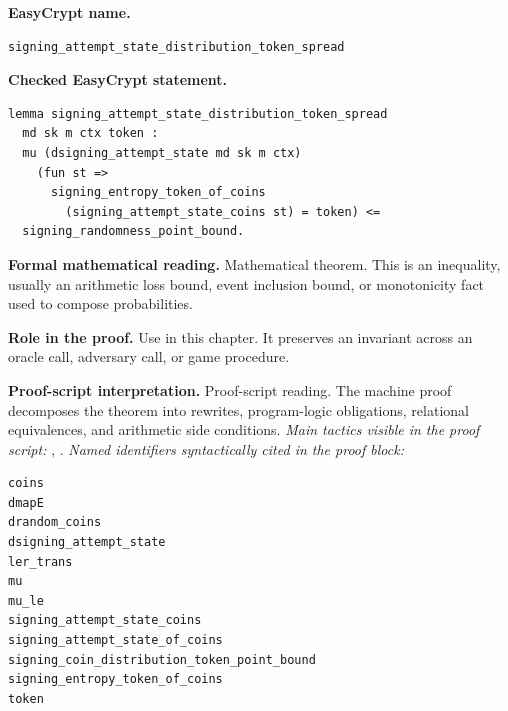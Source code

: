 \begin{formaltheorem}
\noindent\textbf{EasyCrypt name.}
\begin{lstlisting}[language=EasyCrypt,basicstyle=\ttfamily\scriptsize]
signing_attempt_state_distribution_token_spread
\end{lstlisting}
\noindent\textbf{Checked EasyCrypt statement.}
\begin{lstlisting}[language=EasyCrypt,basicstyle=\ttfamily\scriptsize]
lemma signing_attempt_state_distribution_token_spread
  md sk m ctx token :
  mu (dsigning_attempt_state md sk m ctx)
    (fun st =>
      signing_entropy_token_of_coins
        (signing_attempt_state_coins st) = token) <=
  signing_randomness_point_bound.
\end{lstlisting}
\noindent\textbf{Formal mathematical reading.}
Mathematical theorem. This is an inequality, usually an arithmetic loss bound, event inclusion bound, or monotonicity fact used to compose probabilities.

\noindent\textbf{Role in the proof.}
Use in this chapter. It preserves an invariant across an oracle call, adversary call, or game procedure.

\noindent\textbf{Proof-script interpretation.}
Proof-script reading. The machine proof decomposes the theorem into rewrites, program-logic obligations, relational equivalences, and arithmetic side conditions.
\emph{Main tactics visible in the proof script:} , .
\emph{Named identifiers syntactically cited in the proof block:}
\begin{lstlisting}[language=EasyCrypt,basicstyle=\ttfamily\scriptsize]
coins
dmapE
drandom_coins
dsigning_attempt_state
ler_trans
mu
mu_le
signing_attempt_state_coins
signing_attempt_state_of_coins
signing_coin_distribution_token_point_bound
signing_entropy_token_of_coins
token
\end{lstlisting}

\end{formaltheorem}

